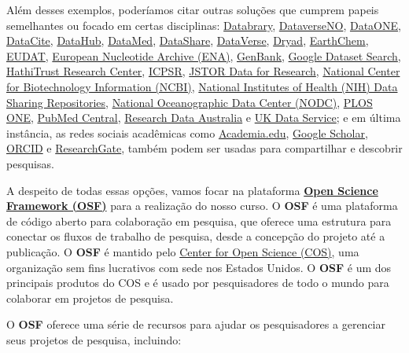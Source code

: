 \documentclass[
  a4paper,
]{book}
\begin{document}
Além desses exemplos, poderíamos citar outras soluções que cumprem
papeis semelhantes ou focado em certas disciplinas:
\href{https://databrary.org}{Databrary},
\href{https://dataverse.no}{DataverseNO},
\href{https://dataone.org}{DataONE},
\href{https://datacite.org}{DataCite},
\href{https://datahub.io}{DataHub}, \href{https://datamed.org}{DataMed},
\href{https://datashare.is.ed.ac.uk}{DataShare},
\href{https://dataverse.org}{DataVerse},
\href{https://datadryad.org}{Dryad},
\href{https://earthchem.org}{EarthChem}, \href{https://eudat.eu}{EUDAT},
\href{https://www.ebi.ac.uk/ena/browser/home}{European Nucleotide
Archive (ENA)}, \href{https://ncbi.nlm.nih.gov/genbank}{GenBank},
\href{https://datasetsearch.research.google.com}{Google Dataset Search},
\href{https://hathitrust.org}{HathiTrust Research Center},
\href{https://icpsr.umich.edu}{ICPSR}, \href{https://jstor.org}{JSTOR
Data for Research}, \href{https://ncbi.nlm.nih.gov}{National Center for
Biotechnology Information (NCBI)}, \href{https://nih.gov}{National
Institutes of Health (NIH) Data Sharing Repositories},
\href{https://data.noaa.gov}{National Oceanographic Data Center (NODC)},
\href{https://plos.org}{PLOS ONE},
\href{https://ncbi.nlm.nih.gov/pmc}{PubMed Central},
\href{http://researchdata.ands.org.au}{Research Data Australia} e
\href{https://ukdataservice.ac.uk}{UK Data Service}; e em última
instância, as redes sociais acadêmicas como
\href{https://academia.edu}{Academia.edu},
\href{https://scholar.google.com}{Google Scholar},
\href{https://orcid.org}{ORCID} e
\href{https://researchgate.net}{ResearchGate}, também podem ser usadas
para compartilhar e descobrir pesquisas.

A despeito de todas essas opções, vamos focar na plataforma
\href{https://osf.io/}{\textbf{Open Science Framework (OSF)}} para a
realização do nosso curso. O \textbf{OSF} é uma plataforma de código
aberto para colaboração em pesquisa, que oferece uma estrutura para
conectar os fluxos de trabalho de pesquisa, desde a concepção do projeto
até a publicação. O \textbf{OSF} é mantido pelo
\href{https://www.cos.io/}{Center for Open Science (COS)}, uma
organização sem fins lucrativos com sede nos Estados Unidos. O
\textbf{OSF} é um dos principais produtos do COS e é usado por
pesquisadores de todo o mundo para colaborar em projetos de pesquisa.

O \textbf{OSF} oferece uma série de recursos para ajudar os
pesquisadores a gerenciar seus projetos de pesquisa, incluindo:
\end{document}
